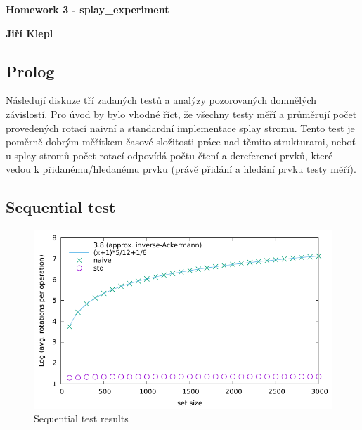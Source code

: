 \documentclass[a4paper,12pt]{article} %
\begin{document}
\thispagestyle{empty} %

\begin{center}
	{\Large \bf Homework 3 - splay\_experiment}
	\vspace{2mm}
	
	{\bf Jiří Klepl}
		
\end{center}  

\vspace{0.4cm}


\setlength{\parindent}{2em}

\subsection*{Prolog}

Následují diskuze tří zadaných testů a analýzy pozorovaných domnělých závislostí. Pro úvod by bylo vhodné říct, že všechny testy měří a průměrují počet provedených rotací naivní a standardní implementace splay stromu. Tento test je poměrně dobrým měřítkem časové složitosti práce nad těmito strukturami, neboť u splay stromů počet rotací odpovídá počtu čtení a dereferencí prvků, které vedou k přidanému/hledanému prvku (právě přidání a hledání prvku testy měří).

\subsection*{Sequential test}

\begin{figure}[!htb]
    \caption{Sequential test results}
    \label{seq_results}
    \includegraphics{sequential.pdf}    
\end{figure}
\end{document}
